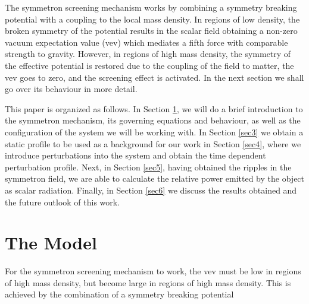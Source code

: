 \documentclass[nofootinbib,twocolumn]{revtex4}
\begin{document}
The symmetron screening mechanism works by combining a symmetry breaking potential with a coupling to the local mass density. In regions of low density, the broken symmetry of the potential results in the scalar field obtaining a non-zero vacuum expectation value (vev) which mediates a fifth force with comparable strength to gravity. However, in regions of high mass density, the symmetry of the effective potential is restored due to the coupling of the field to matter, the vev goes to zero, and the screening effect is activated. In the next section we shall go over its behaviour in more detail.

This paper is organized as follows. In Section \ref{sec2}, we will do a brief introduction to the symmetron mechanism, its governing equations and  behaviour, as well as the configuration of the system we will be working with. In Section \ref{sec3} we obtain a static profile to be used as a background for our work in Section \ref{sec4}, where we introduce perturbations into the system and obtain the time dependent perturbation profile. Next, in Section \ref{sec5}, having obtained the ripples in the symmetron field, we are able to calculate the relative power emitted by the object as scalar radiation. Finally, in Section \ref{sec6} we discuss the results obtained and the future outlook of this work.


\section{The Model}\label{sec2}

For the symmetron screening mechanism to work, the vev must be low in regions of high mass density, but become large in regions of high mass density.
This is achieved by the combination of a symmetry breaking potential \cite{Hinterbichler:2011ca}
\end{document}
